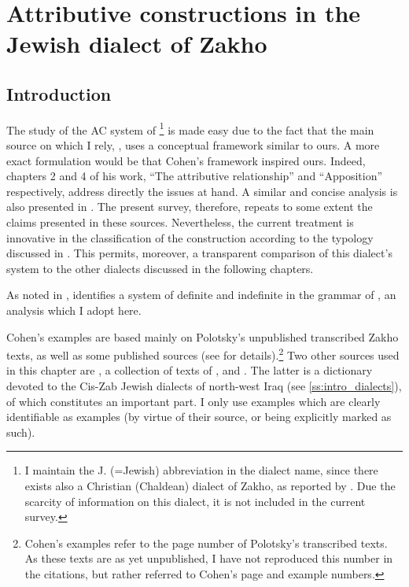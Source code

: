







\chapter{Attributive constructions in the Jewish dialect of Zakho} \label{ch:JZax}
\renewcommand{\defaultDialect}{\JZax}
\section{Introduction}

The study of the AC system of \JZax\footnote{I maintain the J. (=Jewish) abbreviation in the dialect name, since there exists also a Christian (Chaldean) dialect of Zakho, as reported by \citet{HobermanZakho}. Due the scarcity of information on this dialect, it is not included in the current survey.} is made easy due to the fact that the main source on which I rely, \citet{CohenZakho},  uses a conceptual framework similar to ours. {A more exact formulation would be that Cohen's framework inspired ours.} Indeed, chapters 2 and 4 of his work, \enquote{The attributive relationship} and \enquote{Apposition} respectively, address directly the issues at hand. A similar and concise analysis is also presented in \citet{CohenNucleus}.
The present survey, therefore, repeats to some extent the claims presented in these sources. Nevertheless, the current treatment is innovative in the classification of the construction according to the typology discussed in . This permits, moreover, a transparent comparison of this dialect's system to the other dialects discussed in the following chapters. 

As noted in , \citet[20--27]{CohenZakho} identifies a system of definite and indefinite  in the grammar of \JZax, an analysis which I adopt here.











Cohen's examples are based mainly on Polotsky's unpublished transcribed Zakho texts, as well as some published sources (see \cite[5--8]{CohenZakho} for details).\footnote{Cohen's examples refer to the page number of Polotsky's transcribed texts. As these texts are as yet unpublished, I have not reproduced this number in the citations, but rather referred to Cohen's page and example numbers.} Two other sources used in this chapter are \citet{Avineri}, a collection of texts of \JZax, and \citet{SabarDictionary}. The latter is a dictionary devoted to the Cis-Zab Jewish dialects of north-west Iraq (see \ref{ss:intro_dialects}), of which \JZax constitutes an important part.  I only use examples which are clearly identifiable as \JZax examples (by virtue of their source, or being explicitly marked as such). 

